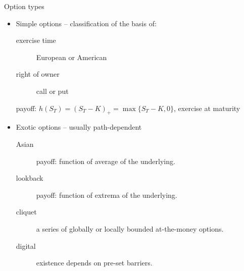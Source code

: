 \documentclass[utf8,t,xcolor=svgnames]{beamer}
\begin{document}
\begin{frame}{Option types}
	\begin{itemize}
		\item Simple options -- classification of the basis of:
		\begin{description}
			\item[exercise time] European or American
			\item[right of owner] call or put
		\end{description}
		\begin{example}
			payoff: $ h(S_T) = (S_T - K)_+ = \max \{S_T - K, 0\} $, exercise at maturity
		\end{example}
		\item Exotic options -- usually path-dependent
		\begin{description}
			\item[\alert{Asian}] payoff: function of average of the underlying.
			\item[lookback] payoff: function of extrema of the underlying.
			\item[\alert{cliquet}] a series of globally or locally bounded at-the-money options.
			\item[digital] existence depends on pre-set barriers.
		\end{description}
	\end{itemize}
\end{frame}
\end{document}
